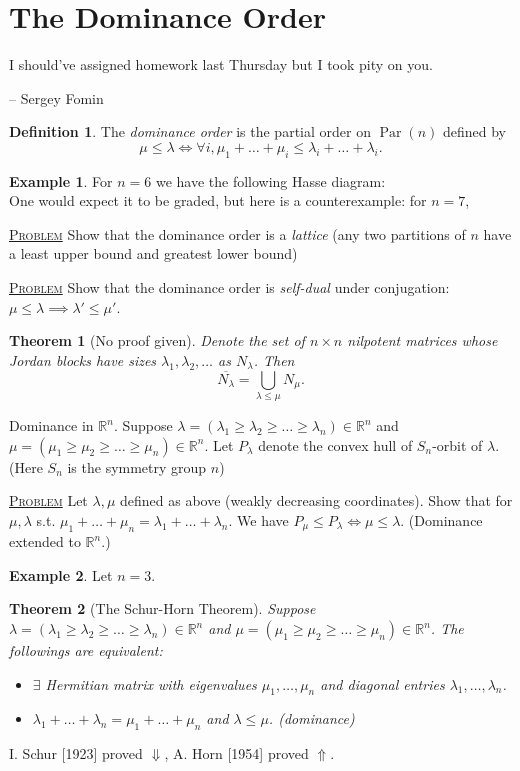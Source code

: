 \documentclass{report}
\newcommand{\R}{\mathbb{R}}
\def \Par {\operatorname{Par}}
\newcommand{\fancyem}[1]{\underline{\textsc{#1}}}
\newtheorem{theorem}{Theorem}[section]
\theoremstyle{definition}
\newtheorem{definition}{Definition}[section]
\newtheorem{example}{Example}[section]
\theoremstyle{remark}
\numberwithin{equation}{section}
\begin{document}
\section{The Dominance Order}
\epigraph{I should've assigned homework last Thursday but I took pity on you.}{-- \textup{Sergey Fomin}}
\begin{definition}
    The \emph{dominance order} is the partial order on $\Par(n)$ defined by
    \[
        \mu \leq \lambda \iff \forall i, \mu_1 + \ldots + \mu_i \leq \lambda_i + \ldots + \lambda_i.    
    \]
\end{definition}
\begin{example}
    For $n = 6$ we have the following Hasse diagram:
    \[\]
    One would expect it to be graded, but here is a counterexample: for $n = 7$,
\end{example}
\fancyem{Problem} Show that the dominance order is a \emph{lattice} (any two partitions of $n$ have a least upper bound and greatest lower bound)

\fancyem{Problem} Show that the dominance order is \emph{self-dual} under conjugation: $\mu \leq \lambda \implies \lambda' \leq \mu'$.

\begin{theorem}[No proof given]
    Denote the set of $n \times n$ nilpotent matrices whose Jordan blocks have sizes $\lambda_1, \lambda_2, \ldots$ as $N_\lambda$. Then
    \[
    \overline{N_\lambda} = \bigcup_{\lambda \leq \mu} N_\mu.    
    \]
\end{theorem}

Dominance in $\R^n$. Suppose $\lambda = (\lambda_1 \geq \lambda_2 \geq \ldots \geq \lambda_n) \in \R^n$ and $\mu = (\mu_1 \geq \mu_2 \geq \ldots \geq \mu_n) \in \R^n$. Let $P_\lambda$ denote the convex hull of $S_n$-orbit of $\lambda$. (Here $S_n$ is the symmetry group $n$)

\fancyem{Problem} Let $\lambda, \mu$ defined as above (weakly decreasing coordinates). Show that for $\mu, \lambda$ s.t. $\mu_1 + \ldots + \mu_n = \lambda_1 + \ldots + \lambda_n$. We have $P_\mu \leq P_\lambda \iff \mu \leq \lambda$. (Dominance extended to $\R^n$.)

\begin{example}
    Let $n = 3$.
\end{example}

\begin{theorem}[The Schur-Horn Theorem]
    Suppose $\lambda = (\lambda_1 \geq \lambda_2 \geq \ldots \geq \lambda_n) \in \R^n$ and $\mu = (\mu_1 \geq \mu_2 \geq \ldots \geq \mu_n) \in \R^n$. The followings are equivalent: \begin{itemize}
        \item $\exists$ Hermitian matrix with eigenvalues $\mu_1, \ldots, \mu_n$ and diagonal entries $\lambda_1, \ldots, \lambda_n$.
        \item $\lambda_1 + \ldots + \lambda_n = \mu_1 + \ldots + \mu_n$ and $\lambda \leq \mu$. (dominance)
    \end{itemize}
\end{theorem}
I. Schur [1923] proved $\Downarrow$, A. Horn [1954] proved $\Uparrow$.
\end{document}
